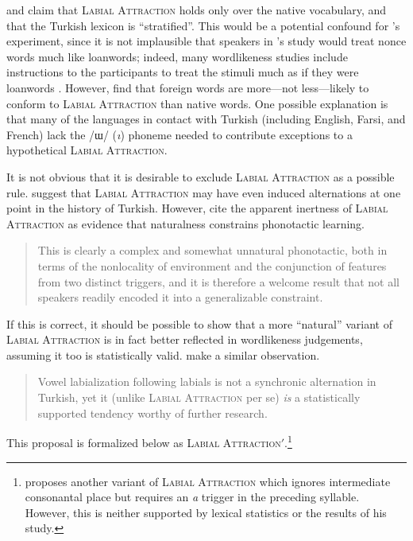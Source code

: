 \citet{Ito1995a,Ito1995b} and \citet{NiChiosain1993} claim that \textsc{Labial Attraction} holds only over the native vocabulary, and that the Turkish lexicon is ``stratified''.
This would be a potential confound for \citeauthor{Zimmer1969}'s experiment, since it is not implausible that speakers in \citeauthor{Zimmer1969}'s study would treat nonce words much like loanwords; indeed, many wordlikeness studies include instructions to the participants to treat the stimuli much as if they were loanwords \citep[e.g.,][]{Hay2004a}.
However, \citet{Inkelas2001} find that foreign words are more---not less---likely to conform to \textsc{Labial Attraction} than native words.
One possible explanation is that many of the languages in contact with Turkish (including English, Farsi, and French) lack the /ɯ/ (\emph{ı}) phoneme needed to contribute exceptions to a hypothetical \textsc{Labial Attraction}.

It is not obvious that it is desirable to exclude \textsc{Labial Attraction} as a possible rule.
\citet[394, fn. 2]{Inkelas1997} suggest that \textsc{Labial Attraction} may have even induced alternations at one point in the history of Turkish.
However, \citeauthor{Becker2011} cite the apparent inertness of \textsc{Labial Attraction} as evidence that naturalness constrains phonotactic learning.

\begin{quote}
This is clearly a complex and somewhat unnatural phonotactic, both in terms of the nonlocality of environment and the conjunction of features from two distinct triggers, and it is therefore a welcome result that not all speakers readily encoded it into a generalizable constraint. \citep[118]{Becker2011}
\end{quote}

If this is correct, it should be possible to show that a more ``natural'' variant of \textsc{Labial Attraction} is in fact better reflected in wordlikeness judgements, assuming it too is statistically valid.
\citeauthor{Inkelas2001} make a similar observation.

\begin{quote}
Vowel labialization following labials is not a synchronic alternation in Turkish, yet it (unlike \textsc{Labial Attraction} per se) \emph{is} a statistically supported tendency worthy of further research. \citep[196]{Inkelas2001}
\end{quote}

\noindent
This proposal is formalized below as \textsc{Labial Attraction}$'$.\footnote{
    \citet{Zimmer1969} proposes another variant of \textsc{Labial Attraction} which ignores intermediate consonantal place but requires an \emph{a} trigger in the preceding syllable. 
    However, this is neither supported by lexical statistics or the results of his study.}

